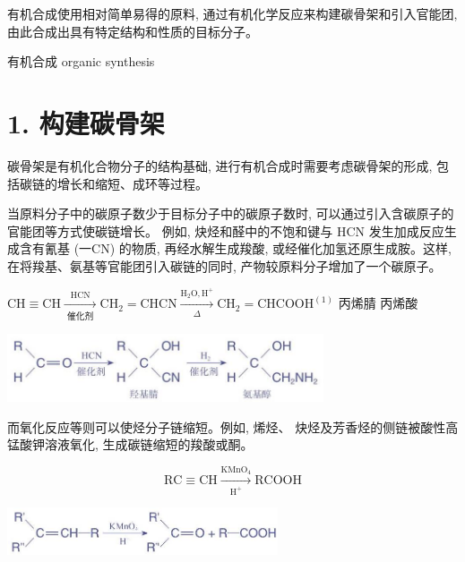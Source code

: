 \documentclass[10pt]{article}
\begin{document}
有机合成使用相对简单易得的原料, 通过有机化学反应来构建碳骨架和引入官能团, 由此合成出具有特定结构和性质的目标分子。

\begin{mdframed}

有机合成 organic synthesis

\end{mdframed}

\section*{1. 构建碳骨架}

碳骨架是有机化合物分子的结构基础, 进行有机合成时需要考虑碳骨架的形成, 包括碳链的增长和缩短、成环等过程。

当原料分子中的碳原子数少于目标分子中的碳原子数时, 可以通过引入含碳原子的官能团等方式使碳链增长。 例如, 炔烃和醛中的不饱和键与 \(\mathrm{{HCN}}\) 发生加成反应生成含有氰基 (一CN) 的物质, 再经水解生成羧酸, 或经催化加氢还原生成胺。这样, 在将羧基、氨基等官能团引入碳链的同时, 产物较原料分子增加了一个碳原子。

\(\mathrm{{CH}} \equiv \mathrm{{CH}}\xrightarrow[\text{ 催化剂 }]{\mathrm{{HCN}}}{\mathrm{{CH}}}_{2} = \mathrm{{CHCN}}\xrightarrow[\Delta ]{{\mathrm{H}}_{2}\mathrm{O},{\mathrm{H}}^{ + }}{\mathrm{{CH}}}_{2} = {\mathrm{{CHCOOH}}}^{\left( 1\right) }\) 丙烯腈 丙烯酸

\begin{center}
\includegraphics[max width=0.7\textwidth]{images/0190efc5-b58a-7c43-bfb0-e0a030df9cfd_90_334685.jpg}
\end{center}

而氧化反应等则可以使烃分子链缩短。例如, 烯烃、 炔烃及芳香烃的侧链被酸性高锰酸钾溶液氧化, 生成碳链缩短的羧酸或酮。

\[
\mathrm{{RC}} \equiv \mathrm{{CH}}\xrightarrow[{\mathrm{H}}^{ + }]{{\mathrm{{KMnO}}}_{4}}\mathrm{{RCOOH}}
\]

\begin{center}
\includegraphics[max width=0.6\textwidth]{images/0190efc5-b58a-7c43-bfb0-e0a030df9cfd_90_620071.jpg}
\end{center}
\end{document}
